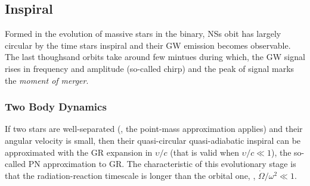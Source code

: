





\subsection{Inspiral}

Formed in the evolution of massive stars in the binary, \acp{NS} obit has largely circular 
\cite{4} by the time stars inspiral and their \ac{GW} emission becomes observable. 
The last thoughsand orbits take around few mintues during which, the \ac{GW} signal rises 
in frequency and amplitude (so-called chirp) and the peak of signal marks the 
\textit{moment of merger}.

\subsubsection{Two Body Dynamics}

If two stars are well-separated (\ie, the point-mass approximation applies) and their 
angular velocity is small, then their quasi-circular
quasi-adiabatic inspiral can be approximated with the \ac{GR} expansion in $\upsilon/c$ 
(that is valid when $\upsilon/c \ll 1$), the so-called \ac{PN} approximation to \ac{GR}.
The characteristic of this evolutionary stage is that the radiation-reaction timescale 
is longer than the orbital one, \ie, $\dot{\Omega}/\omega^2\ll 1$.

